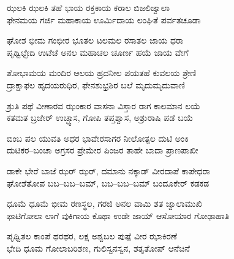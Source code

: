 
\begin{myquote}
ಝಲಕಿ ಝಲಕಿ ತಹೆ ಭಾಯ ರಕ್ತಕಾಯ ಕರಾಲ ಬಿಜಲಿಜ್ವಾಲಾ\\ಫೇನಮಯ ಗರ್ಜಿ ಮಹಾಕಾಯ ಊರ್ಮಿದಾಯ ಲಂಘಿತೆ ಪರ್ವತಚೂಡಾ
\end{myquote}


\begin{myquote}
ಘೋಶ ಭೀಮ ಗಂಭೀರ ಭೂತಲ ಟಲಮಲ ರಸಾತಲ ಜಾಯ ಧರಾ\\ಪೃಥ್ವಿಛ್ಛೇದಿ ಉಟೆಚೆ ಅನಲ ಮಹಾಚಲ ಚೂರ್ಣ ಹಯೆ ಜಾಯ ವೇಗೆ
\end{myquote}


\begin{myquote}
ಶೋಭಾಮಯ ಮಂದಿರ ಆಲಯ ಹ್ರದನೀಲ ಪಯತಹೆ ಕುವಲಯ ಶ್ರೇಣಿ\\ದ್ರಾಕ್ಷಾಫಲ ಹೃದಯರುಧಿರ, ಫೇನಶುಭ್ರಶಿರ ಬಲೆ ಮೃದುಮೃದುವಾಣಿ
\end{myquote}


\begin{myquote}
ಶ್ರುತಿ ಪಥೆ ವೀಣಾರವ ಝಂಕಾರ ವಾಸನಾ ವಿಸ್ತಾರ ರಾಗ ಕಾಲಮಾನ ಲಯೆ\\ಕತಮತ ಬ್ರಜೇರ್‌ ಉಚ್ಛ್ವಾಸ, ಗೋಪಿ ತಪ್ತಶ್ವಾಸ, ಅಶ್ರುರಾಷಿ ಪಡೆ ಬಯೆ
\end{myquote}


\begin{myquote}
ಬಿಂಬ ಪಲ ಯುವತಿ ಅಧರ ಭಾವೇರಸಾಗರ ನೀಲೋತ್ಪಲ ದುಟಿ ಅಂಕಿ\\ದುಟಿಕರ–ಬಂಚಾ ಅಗ್ರಸರ ಪ್ರೇಮೇರ ಪಿಂಜರ ತಾಹೇ ಬಾದಾ ಪ್ರಾಣಪಾಖೀ
\end{myquote}


\begin{myquote}
ಡಾಕೇ ಭೇರೆ ಬಾಜೆ ಝರ್ ಝರ್, ದಮಾನು ನಕ್ಕಾಡ್ ವೀರದಾಪೆ ಕಾಪೇಧರಾ\\ಘೋಶೆತೋಪ ಬಬ–ಬಬ–ಬಮ್, ಬಬ–ಬಬ–ಬಮ್ ಬಂದೂಕೇರ್ ಕಡಕಡ
\end{myquote}


\begin{myquote}
ಧೂಮೆ ಧೂಮೆ ಭೀಮ ರಣಸ್ಥಲ, ಗರಜಿ ಅನಲ ವಾಮಿ ಶತ ಜ್ವಾಲಾಮುಖಿ\\ಫಾಟಿಗೋಲಾ ಲಾಗೆ ವುಕಿಗಾಯ ಕೊಥಾ ಉಡೇ ಜಾಯ್ ಆಸೋಯಾರ ಗೋಢಾಹಾತಿ
\end{myquote}


\begin{myquote}
ಪೃಥ್ವಿತಲ ಕಾಂಪೆ ಥರಥರ, ಲಕ್ಷ ಅಶ್ವಬಲ ಪುಷ್ಪೆ ವೀರ ಝಾಕಿರಣೆ\\ಭೇದಿ ಧೂಮ ಗೋಲಾಬರಿಶಣ, ಗುಲಿಸ್ವನಸ್ವನ, ಶತೃತೋಪ್ ಆನೆಚಿನೆ
\end{myquote}

